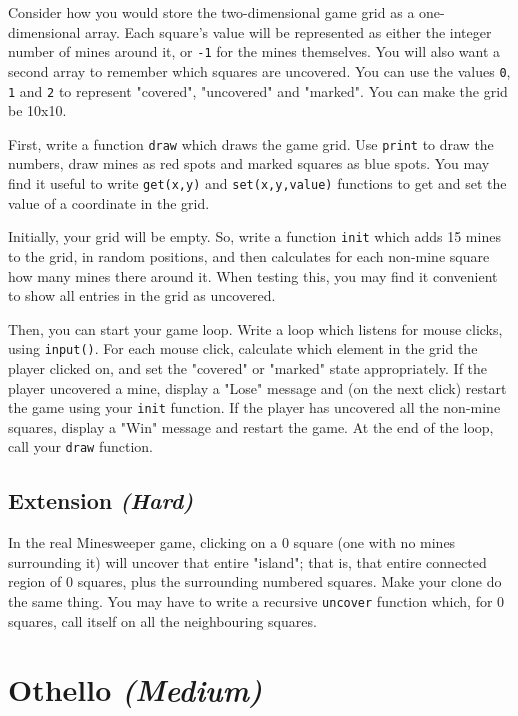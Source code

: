 \documentclass[12pt,a4paper,twoside]{article}
\renewcommand{\_}{\texttt{\symbol{95}}}
\begin{document}
Consider how you would store the two-dimensional game grid as a one-dimensional
array. Each square's value will be represented as either the integer number of
mines around it, or \verb^-1^ for the mines themselves. You will also want a
second array to remember which squares are uncovered. You can use the values
\verb^0^, \verb^1^ and \verb^2^ to represent "covered", "uncovered" and
"marked". You can make the grid be 10x10.

First, write a function \verb^draw^ which draws the game grid. Use \verb^print^
to draw the numbers, draw mines as red spots and marked squares as blue spots.
You may find it useful to write \verb^get(x,y)^ and \verb^set(x,y,value)^
functions to get and set the value of a coordinate in the grid.

Initially, your grid will be empty. So, write a function \verb^init^ which adds
15 mines to the grid, in random positions, and then calculates for each
non-mine square how many mines there around it. When testing this, you may find
it convenient to show all entries in the grid as uncovered.

Then, you can start your game loop. Write a loop which listens for mouse
clicks, using \verb^input()^. For each mouse click, calculate which element in
the grid the player clicked on, and set the "covered" or "marked" state
appropriately. If the player uncovered a mine, display a "Lose" message and (on
the next click) restart the game using your \verb^init^ function. If the player
has uncovered all the non-mine squares, display a "Win" message and restart the
game. At the end of the loop, call your \verb^draw^ function.

\subsection{Extension \it{(Hard)}}

In the real Minesweeper game, clicking on a 0 square (one with no mines
surrounding it) will uncover that entire "island"; that is, that entire
connected region of 0 squares, plus the surrounding numbered squares. Make your
clone do the same thing. You may have to write a recursive \verb^uncover^
function which, for 0 squares, call itself on all the neighbouring squares.

\newpage
\section{Othello \it{(Medium)}}

\end{document}
